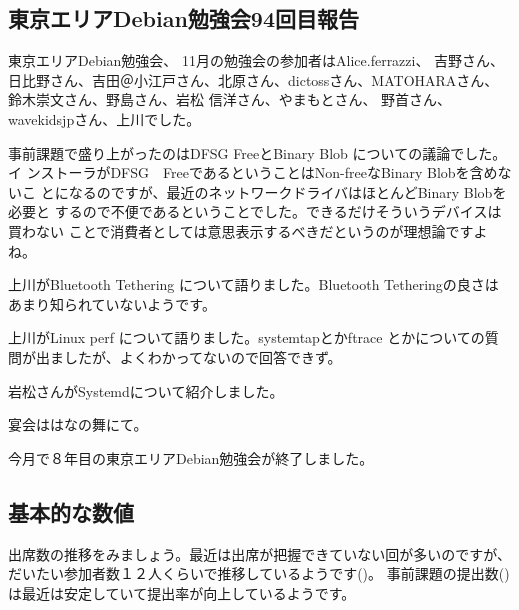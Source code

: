 \documentclass[mingoth,a4paper]{jsarticle}
\begin{document}
\subsection{東京エリアDebian勉強会94回目報告}


東京エリアDebian勉強会、
11月の勉強会の参加者はAlice.ferrazzi、 吉野さん、日比野さん、吉田＠小江戸さん、北原さん、dictossさん、MATOHARAさん、鈴木崇文さん、野島さん、岩松 信洋さん、やまもとさん、
野首さん、wavekidsjpさん、上川でした。

事前課題で盛り上がったのはDFSG FreeとBinary Blob についての議論でした。イ
ンストーラがDFSG　FreeであるということはNon-freeなBinary Blobを含めないこ
とになるのですが、最近のネットワークドライバはほとんどBinary Blobを必要と
するので不便であるということでした。できるだけそういうデバイスは買わない
ことで消費者としては意思表示するべきだというのが理想論ですよね。

上川がBluetooth Tethering について語りました。Bluetooth Tetheringの良さは
あまり知られていないようです。

上川がLinux perf について語りました。systemtapとかftrace とかについての質
問が出ましたが、よくわかってないので回答できず。

岩松さんがSystemdについて紹介しました。

宴会ははなの舞にて。



今月で８年目の東京エリアDebian勉強会が終了しました。

\subsection{基本的な数値}

出席数の推移をみましょう。最近は出席が把握できていない回が多いのですが、
だいたい参加者数１２人くらいで推移しているようです()。
事前課題の提出数()は最近は安定していて提出率が向上しているようです。
\end{document}
